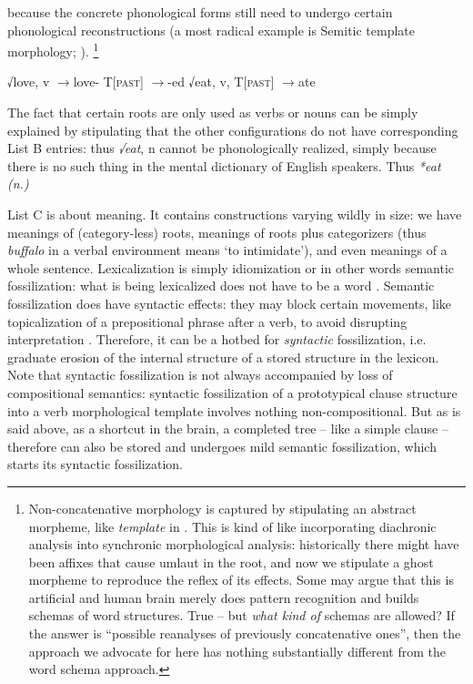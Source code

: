 \documentclass[a4paper, oneside, scheme=plain, 12pt]{article}
\newcommand*{\textto}{$\to$}
\newcommand*{\term}[1]{\emph{#1}}
\newcommand{\form}[1]{\emph{#1}}
\newcommand{\translate}[1]{`#1'}
\newcommand*{\category}[1]{\textsc{#1}}
\begin{document}
because the concrete phonological forms still need to undergo certain phonological reconstructions
(a most radical example is Semitic template morphology; \citealt{tucker2011morphosyntax}).%
\footnote{
    Non-concatenative morphology is captured by stipulating an abstract morpheme,
    like \term{template} in \citet{tucker2011morphosyntax}.
    This is kind of like incorporating diachronic analysis into synchronic morphological analysis:
    historically there might have been affixes that cause umlaut in the root,
    and now we stipulate a ghost morpheme to reproduce the reflex of its effects.
    Some may argue that this is artificial and human brain merely does pattern recognition and builds schemas of word structures.
    True -- but \emph{what kind of} schemas are allowed?
    If the answer is ``possible reanalyses of previously concatenative ones'',
    then the approach we advocate for here has nothing substantially different from the word schema approach.
}

\begin{exe}
    \ex\label{ex:vi} \begin{xlist}
        \ex √love, v \textto love-
        \ex T[\category{past}] \textto -ed
        \ex √eat, v, T[\category{past}] \textto ate
    \end{xlist}
\end{exe}

The fact that certain roots are only used as verbs or nouns
can be simply explained by stipulating that the other configurations do not have corresponding List B entries:
thus \form{√eat}, n cannot be phonologically realized,
simply because there is no such thing in the mental dictionary of English speakers.
Thus \form{*eat (n.)}

List C is about meaning. It contains constructions varying wildly in size:
we have meanings of (category-less) roots,
meanings of roots plus categorizers (thus \form{buffalo} in a verbal environment means \translate{to intimidate}),
and even meanings of a whole sentence.
Lexicalization is simply idiomization or in other words semantic fossilization:
what is being lexicalized does not have to be a word \citep{harley1999distributed}.
Semantic fossilization does have syntactic effects:
they may block certain movements, like topicalization of a prepositional phrase 
after a verb, to avoid disrupting interpretation \citep{nediger2017unifying}.
Therefore, it can be a hotbed for \emph{syntactic} fossilization,
i.e. graduate erosion of the internal structure of a stored structure in the lexicon.
Note that syntactic fossilization is not always accompanied by loss of compositional semantics:
syntactic fossilization of a prototypical clause structure 
into a verb morphological template involves nothing non-compositional.
But as is said above, as a shortcut in the brain,
a completed tree -- like a simple clause -- therefore can also be stored
and undergoes mild semantic fossilization,
which starts its syntactic fossilization.
\end{document}

